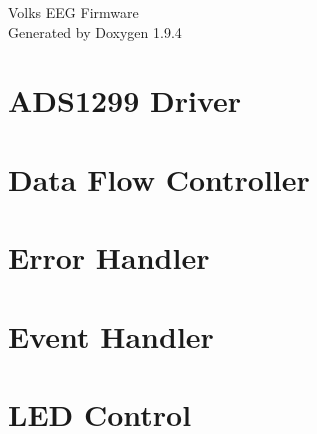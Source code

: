 \documentclass[twoside]{book}
\newcommand{\+}{\discretionary{\mbox{\scriptsize$\hookleftarrow$}}{}{}}
\newcommand{\clearemptydoublepage}{%
    \newpage{\pagestyle{empty}\cleardoublepage}%
  }
\begin{document}
  \raggedbottom
    \hypersetup{pageanchor=false,
                bookmarksnumbered=true,
                pdfencoding=unicode
               }
  \begin{titlepage}
  \vspace*{7cm}
  \begin{center}%
  {\Large Volks EEG Firmware}\\
  \vspace*{1cm}
  {\large Generated by Doxygen 1.9.4}\\
  \end{center}
  \end{titlepage}
  \clearemptydoublepage
  \tableofcontents
  \clearemptydoublepage
  \hypersetup{pageanchor=true}
\chapter{ADS1299 Driver}
\label{md_lib_ads1299_driver__r_e_a_d_m_e}

\chapter{Data Flow Controller}
\label{md_lib_data_flow_controller__r_e_a_d_m_e}

\chapter{Error Handler}
\label{md_lib_error_handler__r_e_a_d_m_e}

\chapter{Event Handler}
\label{md_lib_event_handler__r_e_a_d_m_e}

\chapter{LED Control}
\label{md_lib_led_control__r_e_a_d_m_e}

\end{document}

